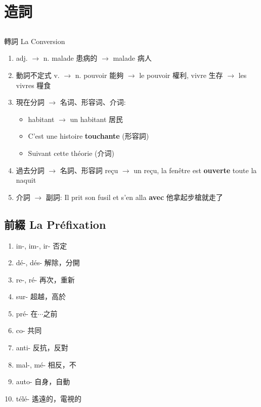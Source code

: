 \documentclass{book}
\begin{document}
\chapter{造詞}
    \section{}{轉詞 La Conversion}
        \begin{enumerate}
            \item adj. $\to$ n. malade 患病的 $\to$ malade 病人
            \item 動詞不定式 v. $\to$ n. pouvoir 能夠 $\to$ le pouvoir 權利, vivre 生存 $\to$ les vivres 糧食
            \item 現在分詞 $\to$ 名词、形容词、介词: 
                \begin{itemize}
                    \item habitant $\to$ un habitant 居民
                    \item C'est une histoire \textbf{touchante} (形容詞)
                    \item Suivant cette théorie (介词)
                \end{itemize}
            \item 過去分詞 $\to$ 名詞、形容詞 reçu $\to$ un reçu, la fenêtre est \textbf{ouverte} toute la naquit
            \item 介詞 $\to$ 副詞: Il prit son fusil et s'en alla \textbf{avec} 他拿起步槍就走了
        \end{enumerate}

    \section{前綴 La Préfixation}
        \begin{enumerate}
            \item in-, im-, ir- 否定
            \item dé-, dés- 解除，分開
            \item re-, ré- 再次，重新
            \item sur- 超越，高於
            \item pré- 在$\cdots$之前
            \item co- 共同
            \item anti- 反抗，反對
            \item mal-, mé- 相反，不
            \item auto- 自身，自動
            \item télé- 遙遠的，電視的
        \end{enumerate}
            
\end{document}
